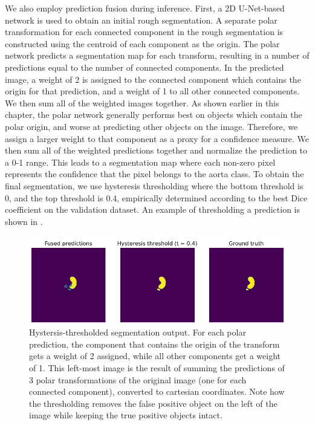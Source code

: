 We also employ prediction fusion during inference. First, a 2D U-Net-based network is used to obtain an initial rough segmentation. A separate polar transformation for each connected component in the rough segmentation is constructed using the centroid of each component as the origin. The polar network predicts a segmentation map for each transform, resulting in a number of predictions equal to the number of connected components. In the predicted image, a weight of 2 is assigned to the connected component which contains the origin for that prediction, and a weight of 1 to all other connected components. We then sum all of the weighted images together. As shown earlier in this chapter, the polar network generally performs best on objects which contain the polar origin, and worse at predicting other objects on the image. Therefore, we assign a larger weight to that component as a proxy for a confidence measure. We then sum all of the weighted predictions together and normalize the prediction to a 0-1 range. This leads to a segmentation map where each non-zero pixel represents the confidence that the pixel belongs to the aorta class. To obtain the final segmentation, we use hysteresis thresholding where the bottom threshold is 0, and the top threshold is 0.4, empirically determined according to the best Dice coefficient on the validation dataset. An example of thresholding a prediction is shown in .

\begin{figure}[t!]
\centering
\includegraphics[width=0.8\columnwidth]{images/4/hyst}
\caption{Hystersis-thresholded segmentation output. For each polar prediction, the component that contains the origin of the transform gets a weight of 2 assigned, while all other components get a weight of 1. This left-most image is the result of summing the predictions of 3 polar transformations of the original image (one for each connected component), converted to cartesian coordinates. Note how the thresholding removes the false positive object on the left of the image while keeping the true positive objects intact. \cite{bencevicUsingPolarTransform2022a}}
\label{fig:thresh}
\end{figure}

